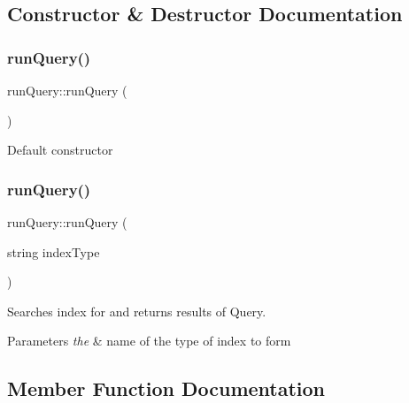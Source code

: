 \subsection{Constructor \& Destructor Documentation}
\mbox{\label{classrunQuery_aaad75dd6d53bfb24bba2ec0b7810f40a}} 
\subsubsection{\texorpdfstring{run\+Query()}{runQuery()}\hspace{0.1cm}{\footnotesize\ttfamily [1/2]}}
{\footnotesize\ttfamily run\+Query\+::run\+Query (\begin{DoxyParamCaption}{ }\end{DoxyParamCaption})}

Default constructor \mbox{\label{classrunQuery_aaef36fd53a33a7c44ee6ef206779dda9}} 
\subsubsection{\texorpdfstring{run\+Query()}{runQuery()}\hspace{0.1cm}{\footnotesize\ttfamily [2/2]}}
{\footnotesize\ttfamily run\+Query\+::run\+Query (\begin{DoxyParamCaption}\item[{string}]{index\+Type }\end{DoxyParamCaption})}



Searches index for and returns results of Query. 


\begin{DoxyParams}{Parameters}
{\em the} & name of the type of index to form \\
\hline
\end{DoxyParams}


\subsection{Member Function Documentation}
\mbox{\label{classrunQuery_a19dcf052ec0adb8c4ed4df0b11094a53}} 
